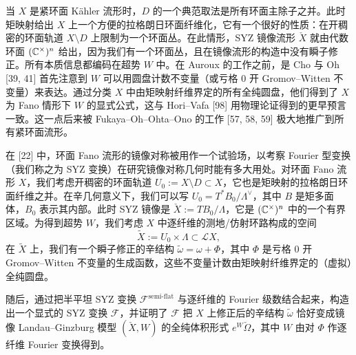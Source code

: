 当 $X$ 是紧环面 Kähler 流形时，$D$ 的一个典范取法是所有环面主除子之并。此时矩映射给出 $X$ 上一个方便的拉格朗日环面纤维化，它有一个很好的性质：在开稠密的环面轨道 $X\setminus D$ 上限制为一个环面丛。在此情形，SYZ 镜像流形 $\check X$ 就由代数环面 $(\mathbb{C}^\times)^n$ 给出，因为我们有一个环面丛，且在镜像流形的构造中没有瞬子修正。所有本质信息都编码在超势 $W$ 中。在 Auroux 的工作之前，是 Cho 与 Oh [39, 41] 首先注意到 $W$ 可以用圆盘计数不变量（或亏格 0 开 Gromov--Witten 不变量）来表达。通过分类 $X$ 中由矩映射纤维界定的所有全纯圆盘，他们得到了 $X$ 为 Fano 情形下 $W$ 的显式公式，这与 Hori--Vafa [98] 用物理论证得到的更早预言一致。这一点后来被 Fukaya--Oh--Ohta--Ono 的工作 [57, 58, 59] 极大地推广到所有紧环面流形。

在 [22] 中，环面 Fano 流形的镜像对称被用作一个试验场，以考察 Fourier 型变换（我们称之为 SYZ 变换）在研究镜像对称几何时能有多大用处。对环面 Fano 流形 $X$，我们考虑开稠密的环面轨道 $U_0:=X\setminus D\subset X$，它也是矩映射的拉格朗日环面纤维之并。在辛几何意义下，我们可以写 $U_0=T^*B_0/\Lambda^\vee$，其中 $B$ 是矩多面体，$B_0$ 表示其内部。此时 SYZ 镜像是 $\check X:=TB_0/\Lambda$，它是 $(\mathbb{C}^\times)^n$ 中的一个有界区域。为得到超势 $W$，我们考虑 $X$ 中逐纤维的测地/仿射环路构成的空间
\[
\tilde X:=U_0\times\Lambda\subset\mathcal{L}X,
\]
在 $\tilde X$ 上，我们有一个瞬子修正的辛结构 $\tilde\omega=\omega+\Phi$，其中 $\Phi$ 是亏格 0 开 Gromov--Witten 不变量的生成函数，这些不变量计数由矩映射纤维界定的（虚拟）全纯圆盘。

随后，通过把半平坦 SYZ 变换 $\mathcal{F}^{\text{semi-flat}}$ 与逐纤维的 Fourier 级数结合起来，构造出一个显式的 SYZ 变换 $\mathcal{F}$，并证明了 $\mathcal{F}$ 把 $X$ 上修正后的辛结构 $\tilde\omega$ 恰好变成镜像 Landau--Ginzburg 模型 $(\check X,W)$ 的全纯体积形式 $e^W\check\Omega$，其中 $W$ 由对 $\Phi$ 作逐纤维 Fourier 变换得到。

